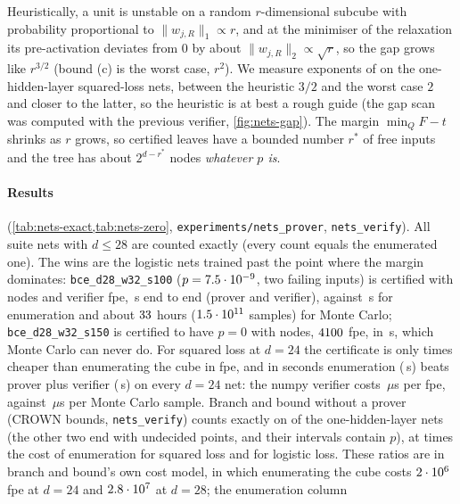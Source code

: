 Heuristically, a unit is unstable on a random $r$-dimensional subcube with probability
proportional to $\|w_{j,R}\|_1\propto r$, and at the minimiser of the relaxation its
pre-activation deviates from $0$ by about $\|w_{j,R}\|_2\propto\sqrt r$, so the gap
grows like $r^{3/2}$ (bound (c) is the worst case, $r^2$). We measure exponents of
\nnGapExp{} on the one-hidden-layer squared-loss nets, between the heuristic $3/2$ and
the worst case $2$ and closer to the latter, so the heuristic is at best a rough guide
(the gap scan was computed with the previous verifier, \cref{fig:nets-gap}). The margin $\min_QF-t$ shrinks
as $r$ grows, so certified leaves have a bounded number $r^*$ of free inputs and the
tree has about $2^{d-r^*}$ nodes \emph{whatever $p$ is}.

\paragraph{Results} (\cref{tab:nets-exact,tab:nets-zero}, \texttt{experiments/nets\_prover},
\texttt{nets\_verify}). All \nnExactNets{} suite nets with $d\le28$ are counted exactly
(every count equals the enumerated one). The wins are the logistic nets trained past
the point where the margin dominates: \texttt{bce\_d28\_w32\_s100} ($p=7.5\cdot10^{-9}$, two
failing inputs) is certified with \nnCertBNodes{} nodes and \nnCertBVerFpe{} verifier
fpe, \nnCertBEnd{}\,s end to end (prover and verifier), against \nnCertBEnum{}\,s for
enumeration and about $33$ hours ($1.5\cdot10^{11}$ samples) for Monte Carlo;
\texttt{bce\_d28\_w32\_s150} is certified to have $p=0$ with \nnCertZeroNodes{} nodes,
$4100$ fpe, in \nnCertZeroEnd{}\,s, which Monte Carlo can never do. For
squared loss at $d=24$ the certificate is only \nnEnumOverCertMse{} times cheaper than
enumerating the cube in fpe, and in seconds enumeration (\nnEnumSecMse{}\,s) beats
prover plus verifier (\nnEndSecMse{}\,s) on every $d=24$ net: the numpy verifier costs
\nnVerUsPerFpe{}\,$\mu$s per fpe, against \nnMcUsPerSample{}\,$\mu$s per Monte Carlo
sample. Branch and bound without a prover (CROWN bounds, \texttt{nets\_verify}) counts
exactly on \nnBabExactRuns{} of the \nnBabRuns{} one-hidden-layer nets (the other two end
with \nnBabAmb{} undecided points, and their intervals contain $p$), at \nnBabEnumMse{}
times the cost of enumeration for squared loss and \nnBabEnumBce{} for logistic loss.
These ratios are in branch and bound's own cost model, in which enumerating the cube costs
$2\cdot10^{6}$ fpe at $d=24$ and $2.8\cdot10^{7}$ at $d=28$; the enumeration column
